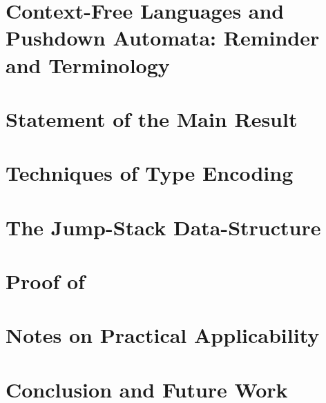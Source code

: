 \documentclass[a4paper,USenglish]{lipics}
\begin{document}
\section{Context-Free Languages and Pushdown Automata: Reminder and Terminology}
\label{Section:pushdown}


\section{Statement of the Main Result} 
\label{Section:result}


\section{Techniques of Type Encoding}
\label{Section:toolkit}


\section{The Jump-Stack Data-Structure}
\label{Section:jump}


\section{Proof of }
\label{Section:proof}


\section{Notes on Practical Applicability}
\label{Section:applicability}


\section{Conclusion and Future Work}
\label{Section:zz}



\small

\end{document}
